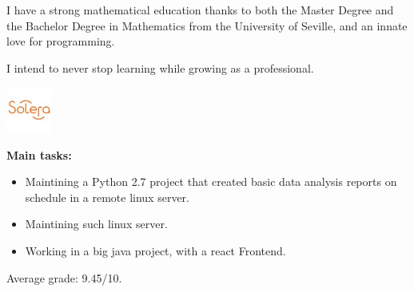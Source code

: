 \documentclass[10pt,a4paper]{altacv}
\begin{document}
\tagline{}

\begin{fullwidth}
\makecvheader
\end{fullwidth}

I have a strong mathematical education thanks to both the Master Degree and the Bachelor Degree in Mathematics from the University of Seville, and an innate love for programming.

I intend to never stop learning while growing as a professional. 
 
\begin{minipage}[t]{0.3\linewidth}
	\centering
  \includegraphics[width=15mm]{soleraInc.jpg}
\end{minipage}
\begin{minipage}[b]{0.69\linewidth}
\end{minipage}

\begin{addmargin}{2em}
\begin{small}
\textbf{Main tasks:}
\begin{itemize}
  \item Maintining a Python 2.7 project that created basic data analysis reports on schedule in a remote linux server.
  \item Maintining such linux server.
  \item Working in a big java project, with a react Frontend.
\end{itemize}
\end{small}
\end{addmargin}

Average grade: 9.45/10.
\end{document}
